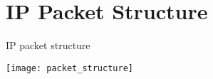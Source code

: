 \chapter{\ac{IP} Packet Structure}
\label{chp:ip_packet}
\begin{table}
\caption{\ac{IP} packet structure}
\label{tbl:packet_structure}
\centering
\vspace{-1in}
\texttt{[image: packet\_structure]}
\end{table}

